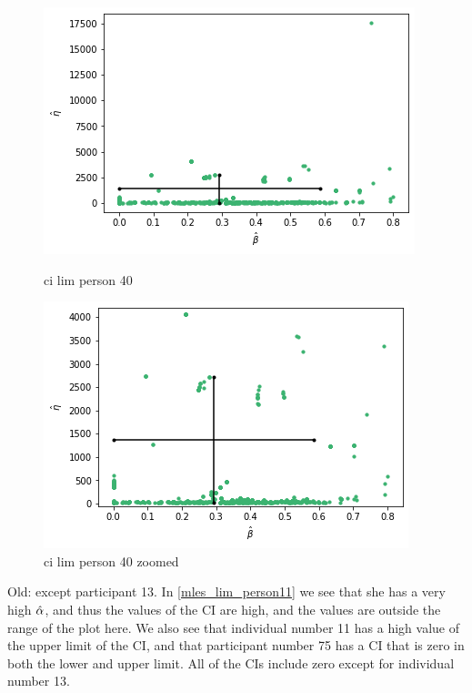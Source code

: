 \begin{figure}
    \centering
    \begin{minipage}{0.48\textwidth}
        \centering
        \includegraphics[scale=0.37]{pictures/ci_lim_b_e_person40.png}
        \caption{ci lim person 40}
        \label{fig:ci_lim_b_e_person_40}
    \end{minipage}\hfill
    \begin{minipage}{0.48\textwidth}
        \centering
        \includegraphics[scale=0.37]{pictures/ci_lim_b_e_person40_zoomed.png}
        \caption{ci lim person 40 zoomed}
        \label{fig:ci_lim_b_e_person_40_zoomed}
    \end{minipage}
\end{figure}





\newpage
Old:
except participant 13. In \eqref{mles_lim_person11} we see that she has a very high $\hat{\alpha}$, and thus the values of the CI are high, and the values are outside the range of the plot here. We also see that individual number 11 has a high value of the upper limit of the CI, and that participant number 75 has a CI that is zero in both the lower and upper limit. All of the CIs include zero except for individual number 13. 



